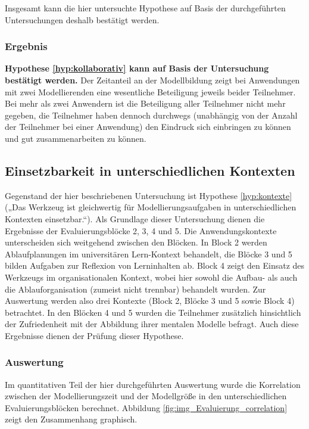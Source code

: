 Insgesamt kann die hier untersuchte Hypothese auf Basis der durchgeführten Untersuchungen deshalb bestätigt werden.

\subsubsection{Ergebnis} %

\textbf{Hypothese \ref{hyp:kollaborativ} kann auf Basis der Untersuchung bestätigt werden.} Der Zeitanteil an der Modellbildung zeigt bei Anwendungen mit zwei Modellierenden eine wesentliche Beteiligung jeweils beider Teilnehmer. Bei mehr als zwei Anwendern ist die Beteiligung aller Teilnehmer nicht mehr gegeben, die Teilnehmer haben dennoch durchwegs (unabhängig von der Anzahl der Teilnehmer bei einer Anwendung) den Eindruck sich einbringen zu können und gut zusammenarbeiten zu können.


\subsection{Einsetzbarkeit in unterschiedlichen Kontexten} %
\label{sub:einsetzbarkeit_in_unterschiedlichen_kontexten}

Gegenstand der hier beschriebenen Untersuchung ist Hypothese \ref{hyp:kontexte} („Das Werkzeug ist gleichwertig für Modellierungsaufgaben in unterschiedlichen Kontexten einsetzbar.“). Als Grundlage dieser Untersuchung dienen die Ergebnisse der Evaluierungsblöcke 2, 3, 4 und 5. Die Anwendungskontexte unterscheiden sich weitgehend zwischen den Blöcken. In Block 2 werden Ablaufplanungen im universitären Lern-Kontext behandelt, die Blöcke 3 und 5 bilden Aufgaben zur Reflexion von Lerninhalten ab. Block 4 zeigt den Einsatz des Werkzeugs im organisationalen Kontext, wobei hier sowohl die Aufbau- als auch die Ablauforganisation (zumeist nicht trennbar) behandelt wurden. Zur Auswertung werden also drei Kontexte (Block 2, Blöcke 3 und 5 sowie Block 4) betrachtet. In den Blöcken 4 und 5 wurden die Teilnehmer zusätzlich hinsichtlich der Zufriedenheit mit der Abbildung ihrer mentalen Modelle befragt. Auch diese Ergebnisse dienen der Prüfung dieser Hypothese.

\subsubsection{Auswertung} 

Im quantitativen Teil der hier durchgeführten Auswertung wurde die Korrelation zwischen der Modellierungszeit und der Modellgröße in den unterschiedlichen Evaluierungsblöcken berechnet. Abbildung \ref{fig:img_Evaluierung_correlation} zeigt den Zusammenhang graphisch.

